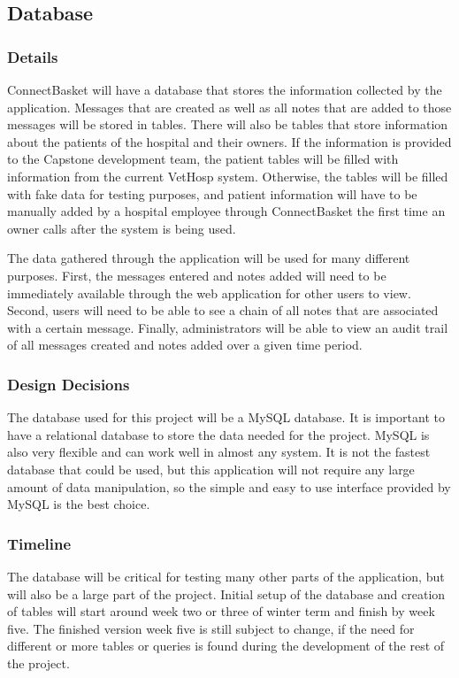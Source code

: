 \documentclass[onecolumn, draftclsnofoot,10pt, compsoc]{IEEEtran}
\begin{document}
\subsection{Database}

\subsubsection{Details}
ConnectBasket will have a database that stores the information collected by the application. Messages that are created as well as all notes that are added to those messages will be stored in tables. There will also be tables that store information about the patients of the hospital and their owners. If the information is provided to the Capstone development team, the patient tables will be filled with information from the current VetHosp system. Otherwise, the tables will be filled with fake data for testing purposes, and patient information will have to be manually added by a hospital employee through ConnectBasket the first time an owner calls after the system is being used.

The data gathered through the application will be used for many different purposes. First, the messages entered and notes added will need to be immediately available through the web application for other users to view. Second, users will need to be able to see a chain of all notes that are associated with a certain message. Finally, administrators will be able to view an audit trail of all messages created and notes added over a given time period.


\subsubsection{Design Decisions}
The database used for this project will be a MySQL database. It is important to have a relational database to store the data needed for the project. MySQL is also very flexible and can work well in almost any system. It is not the fastest database that could be used, but this application will not require any large amount of data manipulation, so the simple and easy to use interface provided by MySQL is the best choice\cite{mysql}.

\subsubsection{Timeline}
The database will be critical for testing many other parts of the application, but will also be a large part of the project. Initial setup of the database and creation of tables will start around week two or three of winter term and finish by week five. The finished version week five is still subject to change, if the need for different or more tables or queries is found during the development of the rest of the project.
\end{document}
